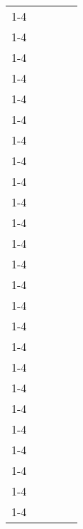 \documentclass[../../main.tex]{subfiles}
\begin{document}
\begin{table}[H]
\begin{tabular}{|l|l|l|l|l}
     &                  &      &                  &  \\ \cline{1-4}
     &                  &      &                  &  \\ \cline{1-4}
     &                  &      &                  &  \\ \cline{1-4}
     &                  &      &                  &  \\ \cline{1-4}
     &                  &      &                  &  \\ \cline{1-4}
     &                  &      &                  &  \\ \cline{1-4}
     &                  &      &                  &  \\ \cline{1-4} 
     &                  &      &                  &  \\ \cline{1-4}
     &                  &      &                  &  \\ \cline{1-4}
     &                  &      &                  &  \\ \cline{1-4}
     &                  &      &                  &  \\ \cline{1-4}
     &                  &      &                  &  \\ \cline{1-4}
     &                  &      &                  &  \\ \cline{1-4}
     &                  &      &                  &  \\ \cline{1-4}
     &                  &      &                  &  \\ \cline{1-4}
     &                  &      &                  &  \\ \cline{1-4}
     &                  &      &                  &  \\ \cline{1-4}
     &                  &      &                  &  \\ \cline{1-4}
     &                  &      &                  &  \\ \cline{1-4}
     &                  &      &                  &  \\ \cline{1-4}
     &                  &      &                  &  \\ \cline{1-4}
     &                  &      &                  &  \\ \cline{1-4}
     &                  &      &                  &  \\ \cline{1-4}
     &                  &      &                  &  \\ \cline{1-4}
     &                  &      &                  &  \\ \cline{1-4} 

\end{tabular}
\end{table}
\newpage
\end{document}
